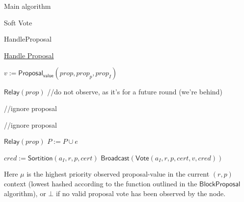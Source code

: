 \documentclass[10pt,a4paper]{article}
\begin{document}
\begin{section}{Main algorithm}
\begin{subsection}{Soft Vote}
\end{subsection}

\begin{subsection}{HandleProposal}\label{ssect:handle-proposal}

    \begin{algorithm}[H]
        \caption{\underline{Handle Proposal}}
        \label{algo:handle-proposal}
        \begin{algorithmic}[1]

            \State $v :=  \mathsf{Proposal_{value}}(prop, prop_{p}, prop_{I})$

                \State $\mathsf{Relay}(prop)$  %
                \State \Return //do not observe, as it's for a future round (we're behind)
            \EndIf

                \Return //ignore proposal
            \EndIf

                \Return //ignore proposal
            \EndIf

            \State $\mathsf{Relay}(prop)$
            \State $P := P \cup e$

                    \State $cred := \mathsf{Sortition}(a_I, r,p, cert)$
                        \State $\mathsf{Broadcast}(\mathsf{Vote}(a_I, r, p, cert, v,  cred))$
                    \EndIf
                \EndFor    
            \EndIf

        \EndFunction
        \end{algorithmic}
    \end{algorithm}
    
    Here $\mu$ is the highest priority observed proposal-value in the current $(r,p)$ context 
    (lowest hashed according to the function outlined in the $\mathsf{BlockProposal}$ algorithm), 
    or $\bot$ if no valid proposal vote has been observed by the node.


\end{subsection}
\end{section}
\end{document}
